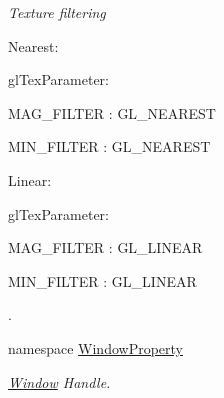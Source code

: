 \begin{DoxyCompactItemize}
\begin{DoxyCompactList}\small\item\em Texture filtering \par
 Nearest: \par
 glTexParameter: \par
 MAG\_\-FILTER : GL\_\-NEAREST \par
 MIN\_\-FILTER : GL\_\-NEAREST \par
 \par
 Linear: \par
 glTexParameter: \par
 MAG\_\-FILTER : GL\_\-LINEAR \par
 MIN\_\-FILTER : GL\_\-LINEAR \par
 \par
. \item\end{DoxyCompactList}

\item 
namespace \hyperlink{namespace_f2_c_1_1_window_property}{WindowProperty}


\begin{DoxyCompactList}\small\item\em \hyperlink{class_f2_c_1_1_window}{Window} Handle. \item\end{DoxyCompactList}

\end{DoxyCompactItemize}
